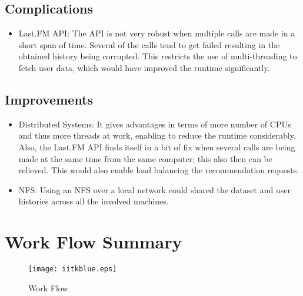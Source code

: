 		\subsection{Complications}
\begin{itemize}
	\item Last.FM API: The API is not very robust when multiple calls are made in a short span of time. Several of the calls tend to get failed resulting in the obtained history being corrupted. This restricts the use of multi-threading to fetch user data, which would have improved the runtime significantly.
\end{itemize}
	
		\subsection{Improvements}
\begin{itemize}
	\item Distributed Systems: It gives advantages in terms of more number of CPUs and thus more threads at work, enabling to reduce the runtime considerably. Also, the Last.FM API finds itself in a bit of fix when several calls are being made at the same time from the same computer; this also then can be relieved. This would also enable load balancing the recommendation requests.
	\item NFS: Using an NFS over a local network could shared the dataset and user histories across all the involved machines.
\end{itemize}

	\section{Work Flow Summary}
		\begin{figure}[h!]
			\centering
			\texttt{[image: iitkblue.eps]}
			\caption{Work Flow\label{work_flow}}
		\end{figure}
			
